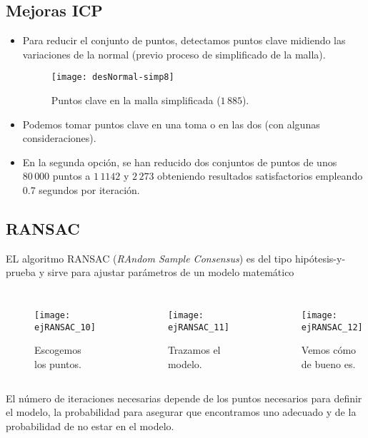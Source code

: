\documentclass[9pt]{beamer}
\begin{document}
	\subsection{Mejoras ICP}
	\begin{frame}
		\justifying
		\begin{itemize}
			\item Para reducir el conjunto de puntos, detectamos puntos clave midiendo las variaciones de la normal (previo proceso de simplificado de la malla).
			
			\begin{figure}[h!]
				\texttt{[image: desNormal-simp8]}
				\caption{Puntos clave en la malla simplificada ($ 1\,885 $).}
			\end{figure} 
			
			\item Podemos tomar puntos clave en una toma o en las dos (con algunas consideraciones).
			\item En la segunda opción, se han reducido dos conjuntos de puntos de unos $ 80\,000 $ puntos a $ 1\,1142 $ y $ 2\,273 $ obteniendo resultados satisfactorios empleando 0.7 segundos por iteración.
		\end{itemize}
		
		
	\end{frame}

	\subsection{RANSAC}
	\begin{frame}
		\justifying
		EL algoritmo RANSAC (\textit{RAndom Sample Consensus}) es del tipo hipótesis-y-prueba y sirve para ajustar parámetros de un modelo matemático
		
		\begin{columns}
			\column{0.33\textwidth}
			\begin{figure}[h!]
				\texttt{[image: ejRANSAC\_10]}
				\caption{Escogemos los puntos.}
			\end{figure}
			\column{0.33\textwidth}
			\begin{figure}[h!]
				\texttt{[image: ejRANSAC\_11]}
				\caption{Trazamos el modelo.}
			\end{figure} 
			\column{0.33\textwidth}
			\begin{figure}[h!]
				\texttt{[image: ejRANSAC\_12]}
				\caption{Vemos cómo de bueno es.}
			\end{figure} 
		\end{columns}
		El número de iteraciones necesarias depende de los puntos necesarios para definir el modelo, la probabilidad para asegurar que encontramos uno adecuado y de la probabilidad de no estar en el modelo.
	\end{frame}	
\end{document}
